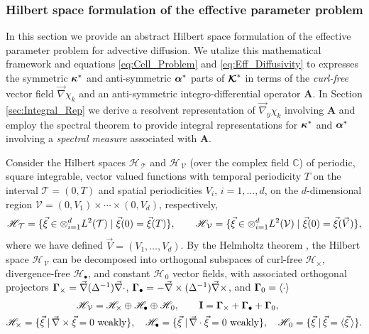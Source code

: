 \documentclass[11pt]{amsart}
\newcommand{\Ib}{\mathbf{I}}
\newcommand{\Ab}{\mathbf{A}}
\newcommand\Kbc{\mbox{\boldmath${\mathcal{K}}$}}
\newcommand{\Tc}{\mathcal{T}}
\newcommand{\Vc}{\mathcal{V}}
\newcommand{\Hs}{\mathscr{H}}
\newcommand\balpha{\mbox{\boldmath${\alpha}$}}
\newcommand\bkappa{\mbox{\boldmath${\kappa}$}}
\newcommand\bGamma{\mbox{\boldmath${\Gamma}$}}
\begin{document}
\subsubsection{Hilbert space formulation of the effective parameter
  problem} \label{sec:Hilbert_Space} 
%
In this section we provide an abstract Hilbert space formulation of
the effective parameter problem for advective diffusion. We utalize
this mathematical framework and equations \eqref{eq:Cell_Problem} and
\eqref{eq:Eff_Diffusivity} to expresses the symmetric $\bkappa^*$ and
anti-symmetric $\balpha^*$ parts of $\Kbc^*$ in terms of the
\emph{curl-free} vector field $\vec{\nabla}\chi_k$ and an anti-symmetric
integro-differential operator $\Ab$. In Section \ref{sec:Integral_Rep}
we derive a resolvent representation of
$\vec{\nabla}_y\chi_k$ involving $\Ab$ and employ the spectral theorem to
provide integral representations for $\bkappa^*$ and $\balpha^*$
involving a \emph{spectral measure} associated with $\Ab$.  




Consider the Hilbert spaces $\Hs_{\,\Tc}$ and $\Hs_{\,\Vc}$ (over the
complex field $\mathbb{C}$) of periodic, square integrable, vector
valued functions with temporal periodicity $T$ on the interval
$\Tc=(0,T)$ and spatial periodicities $V_i$, $i=1,\ldots,d$, on the
$d$-dimensional region $\Vc=(0,V_1)\times\cdots\times(0,V_d)$, respectively,  
%
\begin{align}
  \Hs_{\,\Tc}=\{ 
     \vec{\xi}\in\otimes_{i=1}^dL^2(\Tc)\;|\;
     \vec{\xi}(0)=\vec{\xi}(T) 
                        \}, \qquad
  \Hs_{\,\Vc}=\{ 
     \vec{\xi}\in\otimes_{i=1}^dL^2(\Vc)\;|\;
     \vec{\xi}(0)=\vec{\xi}(\vec{V}) 
                        \}, \notag
\end{align}
%
where we have defined $\vec{V}=(V_1,\ldots,V_d)$. By the Helmholtz theorem
\cite{Denaro:2003:0271,Bhatia:IEE:1077}, 
the Hilbert space $\Hs_{\,\Vc}$ can be decomposed into orthogonal
subspaces of curl-free $\Hs_\times$, divergence-free $\Hs_\bullet$, and constant
$\Hs_{\,0}$ vector fields, with associated orthogonal projectors
$\bGamma_\times=\vec{\nabla}(\Delta^{-1})\vec{\nabla}\cdot$,
$\bGamma_\bullet=-\vec{\nabla}\times(\Delta^{-1})\vec{\nabla}\times$, and 
$\bGamma_0=\langle\cdot\rangle$
\cite{Fannjiang:SIAM_JAM:333,MILTON:2002:TC}    
%
\begin{align}\label{eq:Helmholtz}
  &\Hs_{\,\Vc}=\Hs_\times\oplus\Hs_\bullet\oplus\Hs_{\,0},\qquad
  \Ib=\bGamma_\times+\bGamma_\bullet+\bGamma_0, \\  
  \Hs_\times=\{\vec{\xi}\;|\,\vec{\nabla}\times\vec{\xi}&=0 \text{ weakly}\}, \quad
  \Hs_\bullet
      =\{\vec{\xi}\;|\,\vec{\nabla}\cdot\vec{\xi}=0 \text{ weakly}\},   \quad
  \Hs_{\,0}
      =\{\vec{\xi}\;|\,\vec{\xi}=\langle\vec{\xi}\,\rangle\}.
     \notag  
\end{align}
%
\end{document}
